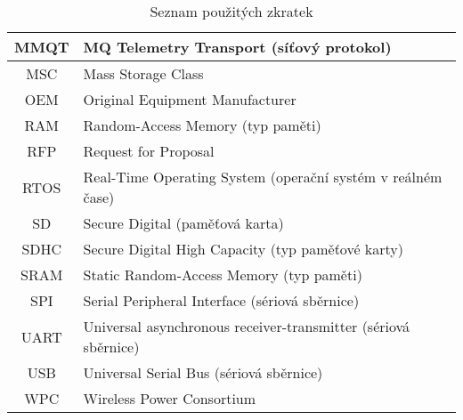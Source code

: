 \begin{table}[h]
\begin{tabular}{|c|l|}
MMQT             & MQ Telemetry Transport (síťový protokol)                                     \\ \hline
MSC              & Mass Storage Class                                                           \\ \hline
OEM              & Original Equipment Manufacturer                                              \\ \hline
RAM              & Random-Access Memory (typ paměti)                                            \\ \hline
RFP              & Request for Proposal                                                         \\ \hline
RTOS             & Real-Time Operating System (operační systém v reálném čase)                  \\ \hline
SD               & Secure Digital (paměťová karta)                                              \\ \hline
SDHC             & Secure Digital High Capacity (typ paměťové karty)                            \\ \hline
SRAM             & Static Random-Access Memory (typ paměti)                                     \\ \hline
SPI              & Serial Peripheral Interface (sériová sběrnice)                               \\ \hline
UART             & Universal asynchronous receiver-transmitter (sériová sběrnice)               \\ \hline
USB              & Universal Serial Bus (sériová sběrnice)                                      \\ \hline
WPC              & Wireless Power Consortium                                                    \\ \hline

\end{tabular}
\caption{Seznam použitých zkratek}
\label{tab:zkratky}
\end{table}